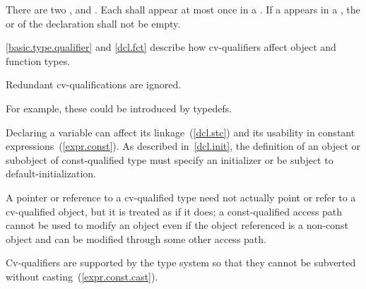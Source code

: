\pnum
There are two ,  and
. Each  shall appear at most once in
a . If a  appears in a
, the 
or  of
the declaration shall not be empty.
\begin{note}
\ref{basic.type.qualifier} and \ref{dcl.fct} describe how cv-qualifiers affect object and
function types.
\end{note}
Redundant cv-qualifications are ignored. \begin{note} For example,
these could be introduced by typedefs.\end{note}

\pnum
\begin{note}
Declaring a variable  can affect its linkage~(\ref{dcl.stc})
and its usability in constant expressions~(\ref{expr.const}). As
described in~\ref{dcl.init}, the definition of an object or subobject
of const-qualified type must specify an initializer or be subject to
default-initialization.
\end{note}

\pnum
A pointer or reference to a cv-qualified type need not actually point or
refer to a cv-qualified object, but it is treated as if it does; a
const-qualified access path cannot be used to modify an object even if
the object referenced is a non-const object and can be modified through
some other access path.
\begin{note}
Cv-qualifiers are supported by the type system so that they cannot be
subverted without casting~(\ref{expr.const.cast}).
\end{note}

